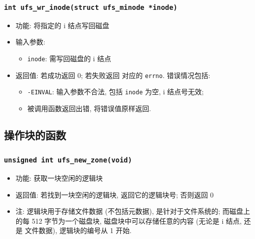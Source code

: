 \documentclass[nofonts, titlepage]{ctexart}
\begin{document}
  \subsubsection[\texttt{ufs\_wr\_inode}]{\texttt{int ufs\_wr\_inode(struct ufs\_minode *inode)}}
  \begin{itemize}
\item
  功能: 将指定的 i 结点写回磁盘
\item
  输入参数:

  \begin{itemize}
  \item
    \texttt{inode}: 需写回磁盘的 i 结点
  \end{itemize}
\item
  返回值: 若成功返回 0; 若失败返回 对应的 \texttt{errno}. 错误情况包括:

  \begin{itemize}
  \item
    \texttt{-EINVAL}: 输入参数不合法, 包括 \texttt{inode} 为空, i
    结点号无效;
  \item
    被调用函数返回出错, 将错误值原样返回.
  \end{itemize}
  \end{itemize}

  \subsection{操作块的函数}
  \subsubsection[\texttt{ufs\_new\_zone}]{\texttt{unsigned int ufs\_new\_zone(void)}}
  \begin{itemize}
\item
  功能: 获取一块空闲的逻辑块
\item
  返回值: 若找到一块空闲的逻辑块, 返回它的逻辑块号; 否则返回 0
\item
  注: 逻辑块用于存储文件数据 (不包括元数据), 是针对于文件系统的;
  而磁盘上 的每 512 字节为一个磁盘块, 磁盘块中可以存储任意的内容 (无论是
  i 结点, 还是 文件数据), 逻辑块的编号从 1 开始.
  \end{itemize}
\end{document}

